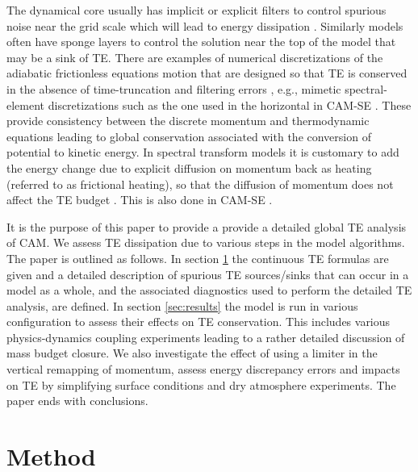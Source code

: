 \documentclass{agujournal}
\begin{document}
The dynamical core usually has implicit or explicit filters to control spurious noise near the grid scale which will lead to energy dissipation \citep{T2008JCP,JW2010LNCSE}. Similarly models often have sponge layers to control the solution near the top of the model that may be a sink of TE. There are examples of numerical discretizations of the adiabatic frictionless equations motion that are designed so that TE is conserved in the absence of time-truncation and filtering errors \citep[e.g., ][]{ER2017GMD,MC2013QJRMS}, e.g., mimetic spectral-element discretizations such as the one used in the horizontal in CAM-SE \citep{T2011LNCSEb}. These provide consistency between the discrete momentum and thermodynamic equations leading to global conservation associated with the conversion of potential to kinetic energy. In spectral transform models it is customary to add the energy change due to explicit diffusion on momentum back as heating (referred to as frictional heating), so that the diffusion of momentum does not affect the TE budget \citep[see, e.g., p.71 in ][]{CAM5}. This is also done in CAM-SE \citep{LetAl2018JAMES}. 

It is the purpose of this paper to provide a provide a detailed global TE analysis of CAM. We assess TE dissipation due to various steps in the model algorithms. The paper is outlined as follows. In section \ref{sec:methods} the continuous TE formulas are given and a detailed description of spurious TE sources/sinks that can occur in a model as a whole, and the associated diagnostics used to perform the detailed TE analysis, are defined. In section \ref{sec:results} the model is run in various configuration to assess their effects on TE conservation. This includes various physics-dynamics coupling experiments leading to a rather detailed discussion of mass budget closure. We also investigate the effect of using a limiter in the vertical remapping of momentum, assess energy discrepancy errors and impacts on TE by simplifying surface conditions and dry atmosphere experiments. The paper ends with conclusions.



\section{Method}
\label{sec:methods}
\end{document}
